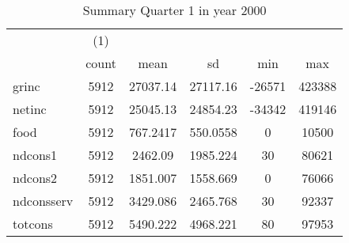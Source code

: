 \begin{table}[htbp]\centering
\def\sym#1{\ifmmode^{#1}\else\(^{#1}\)\fi}
\caption{Summary Quarter 1 in year 2000 \label{sum\_Q1\_y2000}}
\begin{tabular}{l*{1}{ccccc}}
\hline\hline
            &\multicolumn{1}{c}{(1)}&            &            &            &            \\
            &       count&        mean&          sd&         min&         max\\
\hline
grinc       &        5912&    27037.14&    27117.16&      -26571&      423388\\
netinc      &        5912&    25045.13&    24854.23&      -34342&      419146\\
food        &        5912&    767.2417&    550.0558&           0&       10500\\
ndcons1     &        5912&     2462.09&    1985.224&          30&       80621\\
ndcons2     &        5912&    1851.007&    1558.669&           0&       76066\\
ndconsserv  &        5912&    3429.086&    2465.768&          30&       92337\\
totcons     &        5912&    5490.222&    4968.221&          80&       97953\\
\hline\hline
\end{tabular}
\end{table}
